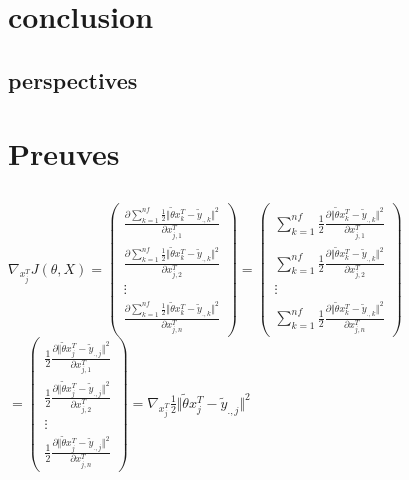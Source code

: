 \documentclass[a4paper,10pt]{article}
\begin{document}
\section{conclusion}

\subsection{perspectives}
\appendix
\section{Preuves}
\subsection{}
\label{P1}
$\nabla_{x_{j}^T} J(\theta, X)=
\begin{pmatrix}
\displaystyle\frac{\partial \displaystyle\sum_{k=1}^{nf}\frac{1}{2}\Vert\tilde{\theta}x_{k}^{T}-\tilde{y}_{.,k}\Vert^{2}}{\partial x_{j,1}^{T}}\\
\displaystyle\frac{\partial \displaystyle\sum_{k=1}^{nf}\frac{1}{2}\Vert\tilde{\theta}x_{k}^{T}-\tilde{y}_{.,k}\Vert^{2}}{\partial x_{j,2}^{T}}\\
\vdots\\
\displaystyle\frac{\partial \displaystyle\sum_{k=1}^{nf}\frac{1}{2}\Vert\tilde{\theta}x_{k}^{T}-\tilde{y}_{.,k}\Vert^{2}}{\partial x_{j,n}^{T}}
\end{pmatrix}
=
\begin{pmatrix}
\displaystyle\sum_{k=1}^{nf}
\frac{1}{2}\frac{\partial\Vert\tilde{\theta}x_{k}^{T}-\tilde{y}_{.,k}\Vert^{2}}{\partial x_{j,1}^{T}}\\
\displaystyle\sum_{k=1}^{nf}
\frac{1}{2}\frac{\partial\Vert\tilde{\theta}x_{k}^{T}-\tilde{y}_{.,k}\Vert^{2}}{\partial x_{j,2}^{T}}\\
\vdots\\
\displaystyle\sum_{k=1}^{nf}
\frac{1}{2}\frac{\partial\Vert\tilde{\theta}x_{k}^{T}-\tilde{y}_{.,k}\Vert^{2}}{\partial x_{j,n}^{T}}
\end{pmatrix}$\\
$
=
\begin{pmatrix}
\displaystyle
\frac{1}{2}\frac{\partial\Vert\tilde{\theta}x_{j}^{T}-\tilde{y}_{.,j}\Vert^{2}}{\partial x_{j,1}^{T}}\\
\displaystyle
\frac{1}{2}\frac{\partial\Vert\tilde{\theta}x_{j}^{T}-\tilde{y}_{.,j}\Vert^{2}}{\partial x_{j,2}^{T}}\\
\vdots\\
\displaystyle
\frac{1}{2}\frac{\partial\Vert\tilde{\theta}x_{j}^{T}-\tilde{y}_{.,j}\Vert^{2}}{\partial x_{j,n}^{T}}
\end{pmatrix}
=
\displaystyle
\nabla_{x_{j}^T}\frac{1}{2}\Vert\tilde{\theta}x_{j}^{T}-\tilde{y}_{.,j}\Vert^{2}
$
\end{document}
